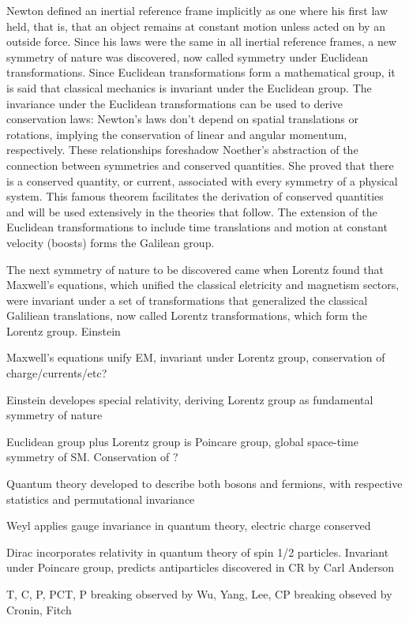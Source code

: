\indent Newton defined an inertial reference frame implicitly as one where his first law held, that is, that an object remains at constant motion unless acted on by an outside force. Since his laws were the same in all inertial reference frames, a new symmetry of nature was discovered, now called symmetry under Euclidean transformations. Since Euclidean transformations form a mathematical group, it is said that classical mechanics is invariant under the Euclidean group. The invariance under the Euclidean transformations can be used to derive conservation laws: Newton's laws don't depend on spatial translations or rotations, implying the conservation of linear and angular momentum, respectively. These relationships foreshadow Noether's abstraction of the connection between symmetries and conserved quantities. She proved that there is a conserved quantity, or current, associated with every symmetry of a physical system. This famous theorem facilitates the derivation of conserved quantities and will be used extensively in the theories that follow. The extension of the Euclidean transformations to include time translations and motion at constant velocity (boosts) forms the Galilean group.

\indent The next symmetry of nature to be discovered came when Lorentz found that Maxwell's equations, which unified the classical eletricity and magnetism sectors, were invariant under a set of transformations that generalized the classical Galiliean translations, now called Lorentz transformations, which form the Lorentz group. Einstein

\indent Maxwell's equations unify EM, invariant under Lorentz group, conservation of charge/currents/etc? 

\indent Einstein developes special relativity, deriving Lorentz group as fundamental symmetry of nature

\indent Euclidean group plus Lorentz group is Poincare group, global space-time symmetry of SM. Conservation of ? 

\indent Quantum theory developed to describe both bosons and fermions, with respective statistics and permutational invariance

\indent Weyl applies gauge invariance in quantum theory, electric charge conserved

\indent Dirac incorporates relativity in quantum theory of spin 1/2 particles. Invariant under Poincare group, predicts antiparticles discovered in CR by Carl Anderson

\indent T, C, P, PCT, P breaking observed by Wu, Yang, Lee, CP breaking obseved by Cronin, Fitch

